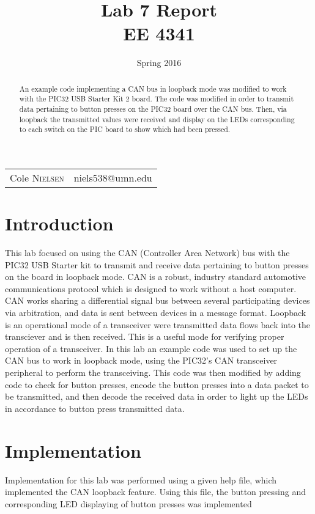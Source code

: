 \documentclass[12pt]{article}
\title{Lab 7 Report\\ \vspace{0.3 in} EE 4341}
\date{Spring 2016}
\begin{document}
\maketitle 
\begin{center}
 \begin{tabular}{l r}
   Cole \textsc{Nielsen} & niels538@umn.edu\\ 
\end{tabular}
\end{center}
\pagebreak
\pagebreak
\begin{abstract}
\noindent An example code implementing a CAN bus in loopback mode was modified to work with the PIC32 USB Starter Kit 2 board. The code was modified in order to transmit data pertaining to button presses on the PIC32 board over the CAN bus. Then, via loopback the transmitted values were received and display on the LEDs corresponding to each switch on the PIC board to show which had been pressed.
\end{abstract}
\hrulefill
\section{Introduction}
This lab focused on using the CAN (Controller Area Network) bus with the PIC32 USB Starter kit to transmit and receive data pertaining to button presses on the board in loopback mode. CAN is a robust, industry standard automotive communications protocol which is designed to work without a host computer. CAN works sharing a differential signal bus between several participating devices via arbitration, and data is sent between devices in a message format. Loopback is an operational mode of a transceiver were transmitted data flows back into the transciever and is then received. This is a useful mode for verifying proper operation of a transceiver. In this lab an example code was used to set up the CAN bus to work in loopback mode, using the PIC32's CAN transceiver peripheral to perform the transceiving. This code was then modified by adding code to check for button presses, encode the button presses into a data packet to be transmitted, and then decode the received data in order to light up the LEDs in accordance to button press transmitted data.
\section{Implementation}
Implementation for this lab was performed using a given help file, which implemented the CAN loopback feature. Using this file, the button pressing and corresponding LED displaying of button presses was implemented
\end{document}

